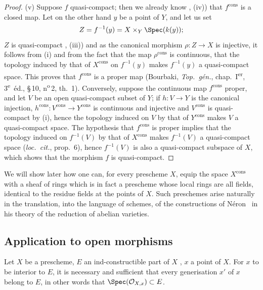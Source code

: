 \begin{proof}
(v) Suppose $f$ quasi-compact; then we already know , (iv)) that $f^{\mathrm{cons}}$ is a closed map.
Let on the other hand $y$ be a point of $Y$, and let us set
\[
  Z=f^{-1}(y)=X\times_Y\Spec(k(y));
\]
$Z$ is quasi-compact , (iii)) and as the canonical morphism $\rho:Z\to X$ is injective, it follows from (i) and from the fact that the map $\rho^{\mathrm{cons}}$ is continuous, that the topology induced by that of $X^{\mathrm{cons}}$ on $f^{-1}(y)$ makes $f^{-1}(y)$ a quasi-compact space.
This proves that $f^{\mathrm{cons}}$ is a proper map (Bourbaki, \emph{Top.\ g\'{e}n.}, chap.~I\textsuperscript{er}, 3\textsuperscript{e}~\'{e}d., \S\,10, n\textsuperscript{o}\,2, th.~1).
Conversely, suppose the continuous map $f^{\mathrm{cons}}$ proper, and let $V$ be an open quasi-compact subset of $Y$; if $h:V\to Y$ is the canonical injection, $h^{\mathrm{cons}}:V^{\mathrm{cons}}\to Y^{\mathrm{cons}}$ is continuous and injective and $V^{\mathrm{cons}}$ is quasi-compact by (i), hence the topology induced on $V$ by that of $Y^{\mathrm{cons}}$ makes $V$ a quasi-compact space.
The hypothesis that $f^{\mathrm{cons}}$ is proper implies that the topology induced on $f^{-1}(V)$ by that of $X^{\mathrm{cons}}$ makes $f^{-1}(V)$ a quasi-compact space (\emph{loc.\ cit.}, prop.~6), hence $f^{-1}(V)$ is also a quasi-compact subspace of $X$, which shows that the morphism $f$ is quasi-compact.
\end{proof}

\begin{env}[1.9.16]
\label{IV.1.9.16}
We will show later how one can, for every prescheme $X$, equip the space $X^{\mathrm{cons}}$ with a sheaf of rings which is in fact a prescheme whose local rings are all fields, identical to the residue fields at the points of $X$.
Such preschemes arise naturally in the translation, into the language of schemes, of the constructions of N\'{e}ron~\cite{IV-32} in his theory of the reduction of abelian varieties.
\end{env}


\subsection{Application to open morphisms}
\label{subsection:IV.1.10}

\begin{theorem}[1.10.1]
\label{IV.1.10.1}
Let $X$ be a prescheme, $E$ an ind-constructible part of $X$ , $x$ a point of $X$.
For $x$ to be interior to $E$, it is necessary and sufficient that every generisation  $x'$ of $x$ belong to $E$, in other words  that $\Spec(\mathcal{O}_{X,x})\subset E$.
\end{theorem}

